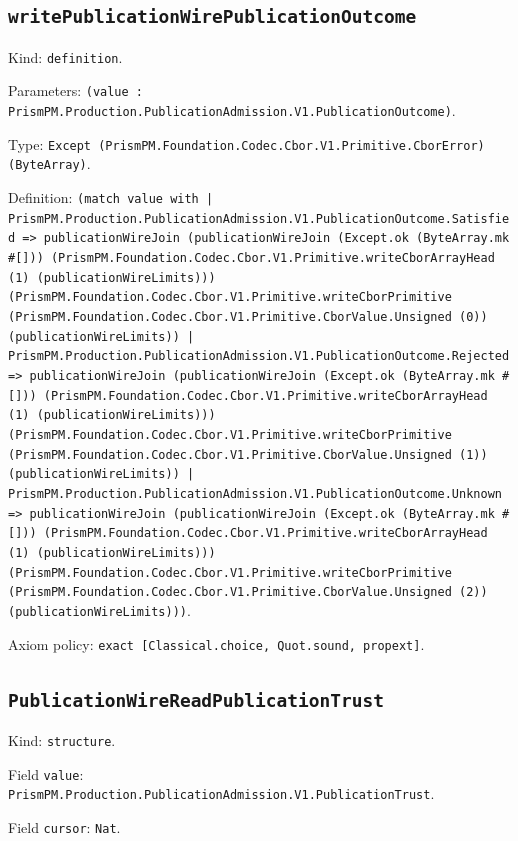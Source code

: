 \documentclass[11pt]{article}
\begin{document}
\subsection*{\texttt{writePublicationWirePublicationOutcome}}
\noindent Kind: \texttt{definition}.\par
\noindent Parameters: \texttt{(value : PrismPM.Production.PublicationAdmission.V1.PublicationOutcome)}.\par
\noindent Type: \texttt{Except (PrismPM.Foundation.Codec.Cbor.V1.Primitive.CborError) (ByteArray)}.\par
\noindent Definition: \texttt{(match value with | PrismPM.Production.PublicationAdmission.V1.PublicationOutcome.Satisfied => publicationWireJoin (publicationWireJoin (Except.ok (ByteArray.mk \#[])) (PrismPM.Foundation.Codec.Cbor.V1.Primitive.writeCborArrayHead (1) (publicationWireLimits))) (PrismPM.Foundation.Codec.Cbor.V1.Primitive.writeCborPrimitive (PrismPM.Foundation.Codec.Cbor.V1.Primitive.CborValue.Unsigned (0)) (publicationWireLimits)) | PrismPM.Production.PublicationAdmission.V1.PublicationOutcome.Rejected => publicationWireJoin (publicationWireJoin (Except.ok (ByteArray.mk \#[])) (PrismPM.Foundation.Codec.Cbor.V1.Primitive.writeCborArrayHead (1) (publicationWireLimits))) (PrismPM.Foundation.Codec.Cbor.V1.Primitive.writeCborPrimitive (PrismPM.Foundation.Codec.Cbor.V1.Primitive.CborValue.Unsigned (1)) (publicationWireLimits)) | PrismPM.Production.PublicationAdmission.V1.PublicationOutcome.Unknown => publicationWireJoin (publicationWireJoin (Except.ok (ByteArray.mk \#[])) (PrismPM.Foundation.Codec.Cbor.V1.Primitive.writeCborArrayHead (1) (publicationWireLimits))) (PrismPM.Foundation.Codec.Cbor.V1.Primitive.writeCborPrimitive (PrismPM.Foundation.Codec.Cbor.V1.Primitive.CborValue.Unsigned (2)) (publicationWireLimits)))}.\par
\noindent Axiom policy: \texttt{exact [Classical.choice, Quot.sound, propext]}.\par
\subsection*{\texttt{PublicationWireReadPublicationTrust}}
\noindent Kind: \texttt{structure}.\par
\noindent Field \texttt{value}: \texttt{PrismPM.Production.PublicationAdmission.V1.PublicationTrust}.\par
\noindent Field \texttt{cursor}: \texttt{Nat}.\par
\end{document}

